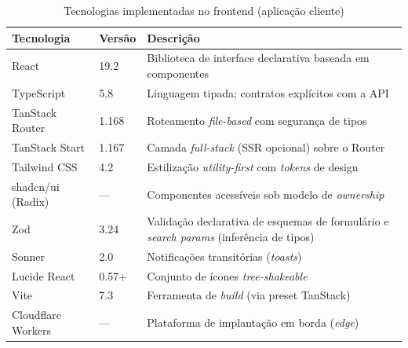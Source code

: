 \begin{table}[H]
\centering
\caption{Tecnologias implementadas no frontend (aplicação cliente)}
\label{tab:tecnologias_frontend}
\begin{tabular}{lll}
\toprule
\textbf{Tecnologia} & \textbf{Versão} & \textbf{Descrição} \\
\midrule
React & 19.2 & Biblioteca de interface declarativa baseada em componentes \\
TypeScript & 5.8 & Linguagem tipada; contratos explícitos com a API \\
TanStack Router & 1.168 & Roteamento \textit{file-based} com segurança de tipos \\
TanStack Start & 1.167 & Camada \textit{full-stack} (SSR opcional) sobre o Router \\
Tailwind CSS & 4.2 & Estilização \textit{utility-first} com \textit{tokens} de design \\
shadcn/ui (Radix) & --- & Componentes acessíveis sob modelo de \textit{ownership} \\
Zod & 3.24 & Validação declarativa de esquemas de formulário e \textit{search params} (inferência de tipos) \\
Sonner & 2.0 & Notificações transitórias (\textit{toasts}) \\
Lucide React & 0.57+ & Conjunto de ícones \textit{tree-shakeable} \\
Vite & 7.3 & Ferramenta de \textit{build} (via preset TanStack) \\
Cloudflare Workers & --- & Plataforma de implantação em borda (\textit{edge}) \\
\bottomrule
\end{tabular}
\end{table}
